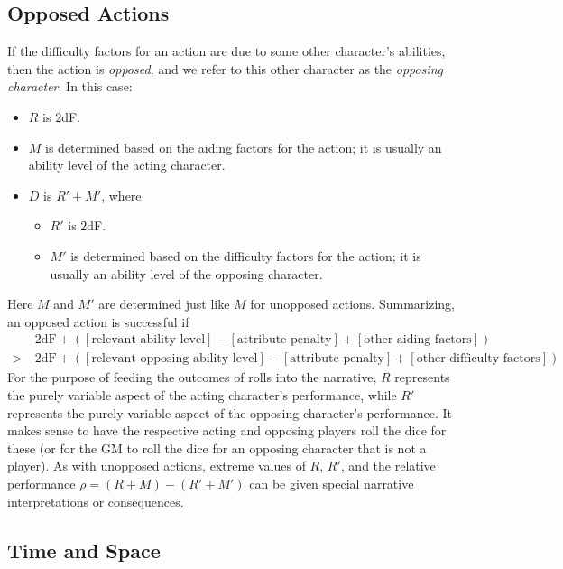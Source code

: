 \documentclass[12pt]{article}
\newcommand{\emdex}[1]{\emph{#1}\index{#1}}
\begin{document}
\subsection{Opposed Actions}\label{sec:opposed}
If the difficulty factors for an action are due to some other character's abilities,
then the action is \emph{opposed}, and we refer to this other character 
as the \emdex{opposing character}.
In this case:
\vspace{-1em}
\begin{itemize}
\item $R$ is $2$dF.
\item $M$ is determined based on the aiding factors for the action; it is usually an ability level of the acting character.
\item $D$ is $R' + M'$, where
\begin{itemize}
\item $R'$ is $2$dF.
\item $M'$ is determined based on the difficulty factors for the action; it is usually an ability level of the opposing character.
\end{itemize}
\end{itemize}
Here $M$ and $M'$ are determined just like $M$ for unopposed actions.
Summarizing, an opposed action is successful if
\begin{align*}
&2\text{dF}
+([\text{relevant ability level}]
-[\text{attribute penalty}]
+[\text{other aiding factors}])\\
>\ & 
2\text{dF}
+([\text{relevant opposing ability level}]
-[\text{attribute penalty}]
+[\text{other difficulty factors}]).
\end{align*}
For the purpose of feeding the outcomes of rolls into the narrative,
$R$ represents the purely variable aspect of the acting character's performance,
while $R'$ represents the purely variable aspect of the opposing character's performance.
It makes sense to have the respective acting and opposing players roll the dice for these (or for the GM to roll the dice for an opposing character that is not a player).
As with unopposed actions, extreme values of $R$, $R'$,
and the relative performance $\rho=(R+M)-(R'+M')$
can be given special narrative interpretations or consequences.


\subsection{Time and Space}
\end{document}
